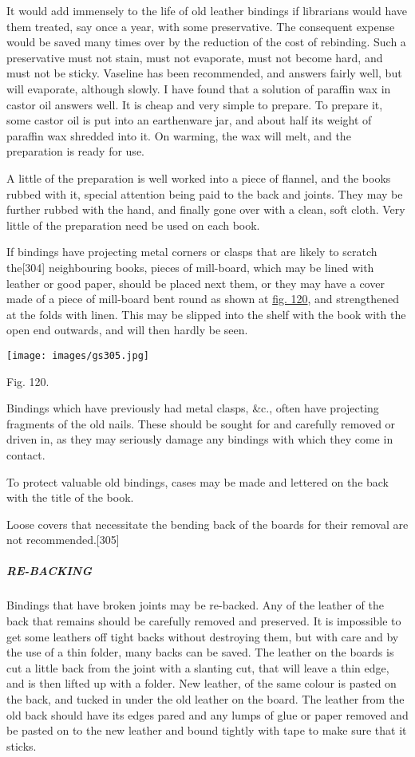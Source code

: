\documentclass[
]{article}
\begin{document}
It would add immensely to the life of old leather bindings if librarians
would have them treated, say once a year, with some preservative. The
consequent expense would be saved many times over by the reduction of
the cost of rebinding. Such a preservative must not stain, must not
evaporate, must not become hard, and must not be sticky. Vaseline has
been recommended, and answers fairly well, but will evaporate, although
slowly. I have found that a solution of paraffin wax in castor oil
answers well. It is cheap and very simple to prepare. To prepare it,
some castor oil is put into an earthenware jar, and about half its
weight of paraffin wax shredded into it. On warming, the wax will melt,
and the preparation is ready for use.

A little of the preparation is well worked into a piece of flannel, and
the books rubbed with it, special attention being paid to the back and
joints. They may be further rubbed with the hand, and finally gone over
with a clean, soft cloth. Very little of the preparation need be used on
each book.

If bindings have projecting metal corners or clasps that are likely to
scratch the{\protect\hypertarget{Page_304}{}{{[}304{]}}} neighbouring
books, pieces of mill-board, which may be lined with leather or good
paper, should be placed next them, or they may have a cover made of a
piece of mill-board bent round as shown at
\protect\hyperlink{Fig_120}{fig. 120}, and strengthened at the folds
with linen. This may be slipped into the shelf with the book with the
open end outwards, and will then hardly be seen.

\protect\hypertarget{Fig_120}{}{}
\texttt{[image: images/gs305.jpg]}

Fig. 120.

Bindings which have previously had metal clasps, \&c., often have
projecting fragments of the old nails. These should be sought for and
carefully removed or driven in, as they may seriously damage any
bindings with which they come in contact.

To protect valuable old bindings, cases may be made and lettered on the
back with the title of the book.

Loose covers that necessitate the bending back of the boards for their
removal are not
recommended.{\protect\hypertarget{Page_305}{}{{[}305{]}}}

\hypertarget{re-backing}{%
\subparagraph{RE-BACKING}\label{re-backing}}

Bindings that have broken joints may be re-backed. Any of the leather of
the back that remains should be carefully removed and preserved. It is
impossible to get some leathers off tight backs without destroying them,
but with care and by the use of a thin folder, many backs can be saved.
The leather on the boards is cut a little back from the joint with a
slanting cut, that will leave a thin edge, and is then lifted up with a
folder. New leather, of the same colour is pasted on the back, and
tucked in under the old leather on the board. The leather from the old
back should have its edges pared and any lumps of glue or paper removed
and be pasted on to the new leather and bound tightly with tape to make
sure that it sticks.
\end{document}

